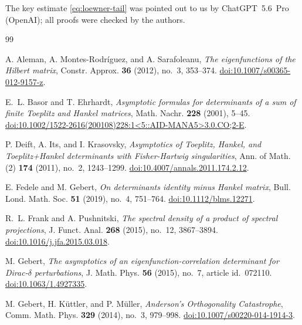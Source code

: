 \documentclass[11pt,a4paper,reqno]{amsart}
\theoremstyle{remark}
\begin{document}
The key estimate \eqref{eq:loewner-tail}
was pointed out to us by ChatGPT~5.6~Pro (OpenAI); all proofs were
checked by the authors.

\begin{thebibliography}{99}

A. Aleman, A. Montes-Rodr\'iguez, and A. Sarafoleanu,
\emph{The eigenfunctions of the Hilbert matrix},
Constr. Approx. \textbf{36} (2012), no.~3, 353--374.
\href{https://doi.org/10.1007/s00365-012-9157-z}{doi:10.1007/s00365-012-9157-z}.

E.~L. Basor and T. Ehrhardt,
\emph{Asymptotic formulas for determinants of a sum of finite Toeplitz and Hankel matrices},
Math. Nachr. \textbf{228} (2001), 5--45.
\href{https://doi.org/10.1002/1522-2616(200108)228:1<5::AID-MANA5>3.0.CO;2-E}{doi:10.1002/1522-2616(200108)228:1<5::AID-MANA5>3.0.CO;2-E}.


P. Deift, A. Its, and I. Krasovsky,
\emph{Asymptotics of Toeplitz, Hankel, and Toeplitz+Hankel determinants with Fisher-Hartwig singularities},
Ann. of Math. (2) \textbf{174} (2011), no.~2, 1243--1299.
\href{https://doi.org/10.4007/annals.2011.174.2.12}{doi:10.4007/annals.2011.174.2.12}.

E. Fedele and M. Gebert,
\emph{On determinants identity minus Hankel matrix},
Bull. Lond. Math. Soc. \textbf{51} (2019), no.~4, 751--764.
\href{https://doi.org/10.1112/blms.12271}{doi:10.1112/blms.12271}.

R.~L. Frank and A. Pushnitski,
\emph{The spectral density of a product of spectral projections},
J. Funct. Anal. \textbf{268} (2015), no.~12, 3867--3894.
\href{https://doi.org/10.1016/j.jfa.2015.03.018}{doi:10.1016/j.jfa.2015.03.018}.

M. Gebert,
\emph{The asymptotics of an eigenfunction-correlation determinant for Dirac-$\delta$ perturbations},
J. Math. Phys. \textbf{56} (2015), no.~7, article id.\ 072110.
\href{https://doi.org/10.1063/1.4927335}{doi:10.1063/1.4927335}.

M. Gebert, H. K\"uttler, and P. M\"uller,
\emph{Anderson's Orthogonality Catastrophe},
Comm. Math. Phys. \textbf{329} (2014), no.~3, 979--998.
\href{https://doi.org/10.1007/s00220-014-1914-3}{doi:10.1007/s00220-014-1914-3}.


\end{thebibliography}
\end{document}
